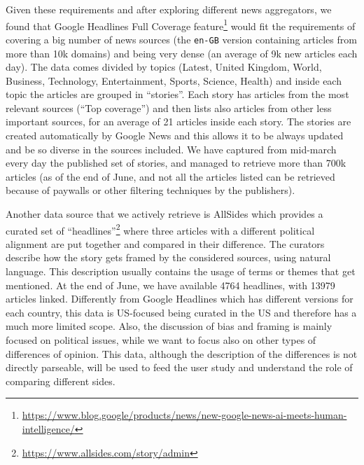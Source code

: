 Given these requirements and after exploring different news aggregators, we found that Google Headlines Full Coverage feature\footnote{\url{https://www.blog.google/products/news/new-google-news-ai-meets-human-intelligence/}} would fit the requirements of covering a big number of news sources (the \texttt{en-GB} version containing articles from more than 10k domains) and being very dense (an average of 9k new articles each day).
The data comes divided by topics (Latest, United Kingdom, World, Business, Technology, Entertainment, Sports, Science, Health) and inside each topic the articles are grouped in ``stories''. Each story has articles from the most relevant sources (``Top coverage'') and then lists also articles from other less important sources, for an average of 21 articles inside each story.
The stories are created automatically by Google News and this allows it to be always updated and be so diverse in the sources included.
We have captured from mid-march every day the published set of stories, and managed to retrieve more than 700k articles (as of the end of June, and not all the articles listed can be retrieved because of paywalls or other filtering techniques by the publishers).

Another data source that we actively retrieve is AllSides which provides a curated set of ``headlines''\footnote{\url{https://www.allsides.com/story/admin}} where three articles with a different political alignment are put together and compared in their difference.
The curators describe how the story gets framed by the considered sources, using natural language.
This description usually contains the usage of terms or themes that get mentioned.
At the end of June, we have available 4764 headlines, with 13979 articles linked.
Differently from Google Headlines which has different versions for each country, this data is US-focused being curated in the US and therefore has a much more limited scope. Also, the discussion of bias and framing is mainly focused on political issues, while we want to focus also on other types of differences of opinion.
This data, although the description of the differences is not directly parseable, will be used to feed the user study and understand the role of comparing different sides.


